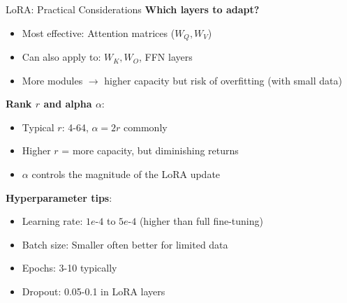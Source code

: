 \documentclass[11pt]{beamer}
\begin{document}
\begin{frame}{LoRA: Practical Considerations}
    \textbf{Which layers to adapt?}
    \begin{itemize}
        \item Most effective: Attention matrices ($W_Q, W_V$)
        \item Can also apply to: $W_K, W_O$, FFN layers
        \item More modules $\to$ higher capacity but risk of overfitting (with small data)
    \end{itemize}
    \vspace{0.5em}
    \textbf{Rank $r$ and alpha $\alpha$}:
    \begin{itemize}
        \item Typical $r$: 4-64, $\alpha = 2r$ commonly
        \item Higher $r$ = more capacity, but diminishing returns
        \item $\alpha$ controls the magnitude of the LoRA update
    \end{itemize}
    \vspace{0.5em}
    \textbf{Hyperparameter tips}:
    \begin{itemize}
        \item Learning rate: $1e$-$4$ to $5e$-$4$ (higher than full fine-tuning)
        \item Batch size: Smaller often better for limited data
        \item Epochs: 3-10 typically
        \item Dropout: 0.05-0.1 in LoRA layers
    \end{itemize}
\end{frame}
\end{document}
